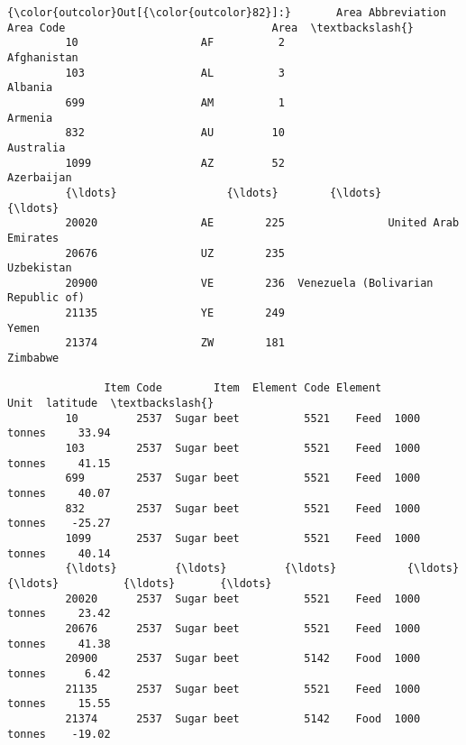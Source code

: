 \documentclass[11pt]{article}
\begin{document}
\begin{Verbatim}[commandchars=\\\{\}]
{\color{outcolor}Out[{\color{outcolor}82}]:}       Area Abbreviation  Area Code                                Area  \textbackslash{}
         10                   AF          2                         Afghanistan   
         103                  AL          3                             Albania   
         699                  AM          1                             Armenia   
         832                  AU         10                           Australia   
         1099                 AZ         52                          Azerbaijan   
         {\ldots}                 {\ldots}        {\ldots}                                 {\ldots}   
         20020                AE        225                United Arab Emirates   
         20676                UZ        235                          Uzbekistan   
         20900                VE        236  Venezuela (Bolivarian Republic of)   
         21135                YE        249                               Yemen   
         21374                ZW        181                            Zimbabwe   
         
               Item Code        Item  Element Code Element         Unit  latitude  \textbackslash{}
         10         2537  Sugar beet          5521    Feed  1000 tonnes     33.94   
         103        2537  Sugar beet          5521    Feed  1000 tonnes     41.15   
         699        2537  Sugar beet          5521    Feed  1000 tonnes     40.07   
         832        2537  Sugar beet          5521    Feed  1000 tonnes    -25.27   
         1099       2537  Sugar beet          5521    Feed  1000 tonnes     40.14   
         {\ldots}         {\ldots}         {\ldots}           {\ldots}     {\ldots}          {\ldots}       {\ldots}   
         20020      2537  Sugar beet          5521    Feed  1000 tonnes     23.42   
         20676      2537  Sugar beet          5521    Feed  1000 tonnes     41.38   
         20900      2537  Sugar beet          5142    Food  1000 tonnes      6.42   
         21135      2537  Sugar beet          5521    Feed  1000 tonnes     15.55   
         21374      2537  Sugar beet          5142    Food  1000 tonnes    -19.02   
         

\end{Verbatim}
\end{document}
